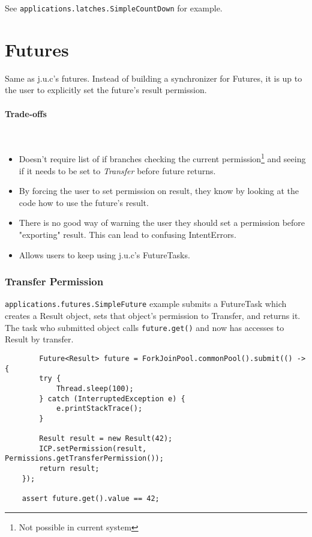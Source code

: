 \documentclass[11pt]{article}
\begin{document}
    See \lstinline{applications.latches.SimpleCountDown} for example.

    \section{Futures}
    Same as j.u.c's futures. Instead of building a synchronizer for Futures, it is up to the user to
    explicitly set the future's result permission.

    \paragraph{Trade-offs}\mbox{} \\
    \begin{itemize}
        \item Doesn't require list of if branches checking the current permission\footnote{Not possible in current system}
        and seeing if it needs to be set to \textit{Transfer} before future returns.
        \item By forcing the user to set permission on result, they know by looking at the code how to use
        the future's result.
        \item There is no good way of warning the user they should set a permission before "exporting" result.
        This can lead to confusing IntentErrors.
        \item Allows users to keep using j.u.c's FutureTasks.
    \end{itemize}

    \subsubsection{Transfer Permission}
    \lstinline{applications.futures.SimpleFuture} example submits a FutureTask which creates a Result object,
    sets that object's permission to Transfer, and returns it. The task who submitted object calls \lstinline{future.get()}
    and now has accesses to Result by transfer.

    \begin{lstlisting}
        Future<Result> future = ForkJoinPool.commonPool().submit(() -> {
        try {
            Thread.sleep(100);
        } catch (InterruptedException e) {
            e.printStackTrace();
        }

        Result result = new Result(42);
        ICP.setPermission(result, Permissions.getTransferPermission());
        return result;
    });

    assert future.get().value == 42;
    \end{lstlisting}
\end{document}

